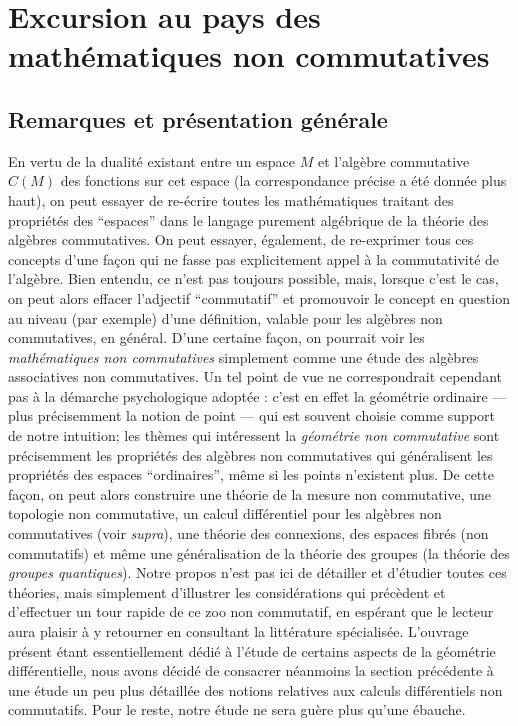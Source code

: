 \section{Excursion au pays des math\'ematiques non commutatives}
\subsection{Remarques et pr\'esentation g\'en\'erale}
En vertu de la dualit\'e existant entre un espace $M$ et l'alg\`ebre 
commutative $C(M)$ des fonctions sur cet espace (la correspondance 
pr\'ecise a \'et\'e donn\'ee plus haut), on peut essayer de re-\'ecrire toutes 
les math\'ematiques traitant des propri\'et\'es des ``espaces'' dans le 
langage purement alg\'ebrique de la th\'eorie des alg\`ebres commutatives. 
On peut essayer, \'egalement, de re-exprimer tous ces concepts d'une 
fa\c con qui ne fasse pas explicitement appel \`a la commutativit\'e de 
l'alg\`ebre. Bien entendu, ce n'est pas toujours possible, mais, lorsque 
c'est le cas, on peut alors effacer l'adjectif ``commutatif'' et 
promouvoir le concept en question au niveau (par exemple) d'une d\'efinition, valable 
pour les alg\`ebres non commutatives, en g\'en\'eral. 
D'une certaine fa\c con, on pourrait voir les {\sl 
math\'ematiques non commutatives\/} simplement comme  une \'etude des 
alg\`ebres associatives non commutatives. Un tel point de vue ne 
correspondrait cependant pas \`a la d\'emarche psychologique adopt\'ee : c'est 
en effet la g\'eom\'etrie ordinaire --- plus pr\'ecisemment la notion de 
point ---  qui est souvent choisie comme support de 
notre intuition;  les th\`emes qui int\'eressent la {\sl g\'eom\'etrie non 
commutative\/} sont pr\'ecisemment les propri\'et\'es des alg\`ebres non 
commutatives qui g\'en\'eralisent les propri\'et\'es des espaces 
``ordinaires'', m\^eme si les points n'existent plus. De cette fa\c con, on peut 
alors construire une th\'eorie de la mesure non commutative, une 
topologie non commutative, un calcul diff\'erentiel pour les alg\`ebres 
non commutatives (voir {\it supra\/}), une th\'eorie des connexions, des 
espaces fibr\'es (non 
commutatifs) et m\^eme une g\'en\'eralisation de la th\'eorie des groupes (la 
th\'eorie des {\sl groupes quantiques\/}). Notre propos n'est pas ici de 
d\'etailler et d'\'etudier toutes ces th\'eories, mais simplement 
d'illustrer les consid\'erations qui pr\'ec\`edent et d'effectuer un tour rapide de ce 
zoo non commutatif, en esp\'erant que le lecteur aura plaisir \`a y 
retourner en consultant la litt\'erature sp\'ecialis\'ee. L'ouvrage pr\'esent \'etant essentiellement d\'edi\'e \`a l'\'etude de 
certains aspects de la g\'eom\'etrie diff\'erentielle, nous avons d\'ecid\'e de consacrer 
n\'eanmoins la section pr\'ec\'edente \`a une \'etude un peu plus d\'etaill\'ee des notions relatives aux 
calculs diff\'erentiels non commutatifs. Pour le reste, notre \'etude ne 
sera gu\`ere plus qu'une \'ebauche.


